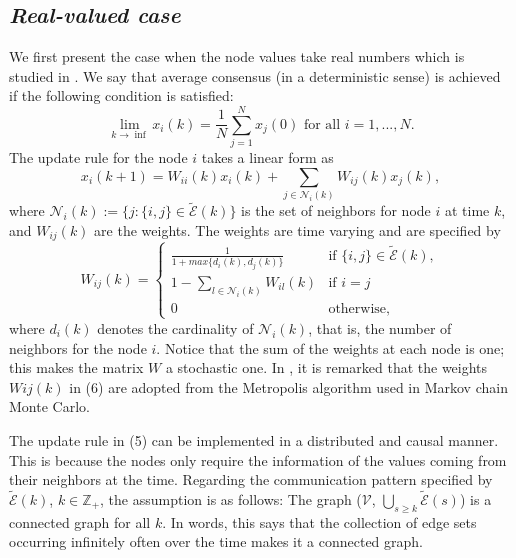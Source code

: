 \documentclass[12pt]{article}
\begin{document}
		\subsection{\textit{Real-valued case}}
			We first present the case when the node values take real numbers which is studied in \cite{bib28}. We say that average consensus (in a deterministic sense) is achieved if the following condition is satisfied:
			\begin{equation}
				\lim_{k \rightarrow \inf} x_i(k) = \frac{1}{N} \sum_{j=1}^{N} x_j(0) \text{ for all } i = 1, ..., N.
			\end{equation}
			The update rule for the node $i$ takes a linear form as
			\begin{equation}
				x_i(k+1)=W_{ii}(k) x_i(k) + \sum_{j \in \mathscr{N}_i(k)} W_{ij}(k) x_j(k),
			\end{equation}
			where $\mathscr{N}_i(k) := \{j : \{i, j\} \in \tilde{\mathscr{E}}(k)\}$ is the set of neighbors for node $i$ at time $k$, and $W_{ij}(k)$ are the weights. The weights are time varying and are specified by
			\begin{equation}
				W_{ij}(k)=\begin{cases}
					\frac{1}{1+max\{d_{i}(k),d_{j}(k)\}} & \text{if }\{i,j\}\in \ensuremath{\tilde{\mathscr{E}}(k),}\\
					1-\sum_{l\in\mathscr{N}_{i}(k)}W_{il}(k) & \text{if }i=j\\
					0 & \text{otherwise,}
				\end{cases}
			\end{equation}
			where $d_i(k)$ denotes the cardinality of $\mathscr{N}_i(k)$, that is, the number of neighbors for the node $i$. Notice that the sum of the weights at each node is one; this makes the matrix $W$ a stochastic one. In \cite{bib28}, it is remarked that the weights $Wij(k)$ in (6) are adopted from the Metropolis algorithm used in Markov chain Monte Carlo. 
			\par
			The update rule in (5) can be implemented in a distributed and causal manner. This is because the nodes only require the information of the values coming from their neighbors at the time. Regarding the communication pattern specified by $\tilde{\mathscr{E}}(k)$, $k \in \mathbb{Z}_+$, the assumption is as follows: The graph ($\mathscr{V}$, $\bigcup_{s \geq k} \tilde{\mathscr{E}}(s)$) is a connected graph for all $k$. In words, this says that the collection of edge sets occurring infinitely often over the time makes it a connected graph. 
			\par
\end{document}
